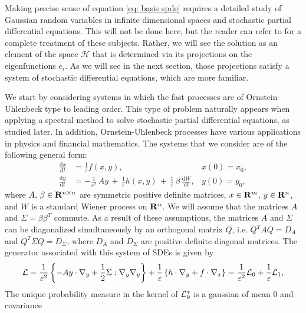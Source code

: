 Making precise sense of equation \eqref{eq: basis spde} requires a detailed study
of Gaussian random variables in infinite dimensional spaces and stochastic
partial differential equations. This will not be done here, but the reader can
refer to \citep{da2008stochastic,hairerphd,hairer2009introduction} for a
complete treatment of these subjects. Rather, we will see the solution as an
element of the space $\mathcal H$ that is determined via its projections on the
eigenfunctions $e_i$. As we will see in the next section, those projections
satisfy a system of stochastic differential equations, which are more familiar.

\label{sec:numerical_method_for_the_solution_of_multiscale_sdes}
We start by considering systems in which the fast processes are of
Ornstein-Uhlenbeck type to leading order. This type of problem naturally
appears when applying a spectral method to solve stochastic partial
differential equations, as studied later. In addition,
Ornstein-Uhlenbeck processes have various applications in physics and financial
mathematics. The systems that we consider are of the following general form:
\begin{equation}
    \begin{aligned}
        \frac{\mathrm d x}{\mathrm d t} &= \frac 1 {\varepsilon}f(x,y), &x(0) = x_{0},\\
        \frac{\mathrm d y}{\mathrm d t} &= -\frac 1{{\varepsilon}^2}\, A y\,+\,\frac 1{\varepsilon}
        h(x,y)\,+\,\frac{1}{{\varepsilon}}\,{\beta}\, \frac{\mathrm d W}{\mathrm d t}, & y(0) = y_{0},
    \end{aligned}
    \label{eq: general system for Hermite-Galerkin}
\end{equation}
where $A,\, \beta\in \mathbf R^{n\times n}$ are symmetric positive definite
matrices, $x\in\mathbf R^m$, $y\in\mathbf R^n$, and $W$ is a standard Wiener
process on $\mathbf R^n$. We will assume that the matrices $A$ and $\Sigma =
\beta \beta^T$ commute. As a result of these assumptions, the matrices $A$ and
$\Sigma$ can be diagonalized simultaneously by an orthogonal matrix $Q$, i.e.
$Q^T A Q = D_A$ and $Q^T \Sigma Q= D_\Sigma$, where $D_A$ and $D_\Sigma$ are positive definite
diagonal matrices.  The generator associated with this system of SDEs is given by 
$$
\mathcal L =  \frac{1}{\varepsilon^2} \left\{ -A y \cdot\nabla_y + \frac{1}{2} 
    \Sigma:\nabla_y\nabla_y \right\} + \frac{1}{\varepsilon} \left\{ h\cdot\nabla_y + f\cdot \nabla_x \right\} = \frac{1}{\varepsilon^2}\mathcal L_0 + \frac{1}{\varepsilon}\mathcal L_1,
$$
The unique probability measure
in the kernel of $\mathcal L_0^*$ is a gaussian of mean $0$ and covariance
